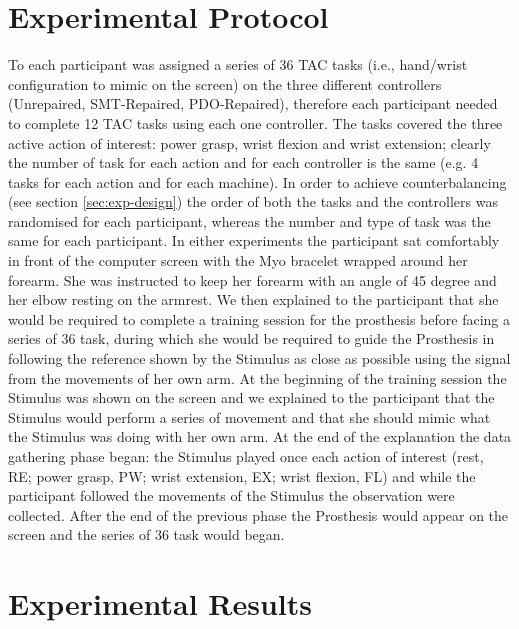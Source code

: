 \section{Experimental Protocol}\label{sec:exp-protocol}
To each participant was assigned a series of 36 TAC tasks (i.e., hand/wrist configuration to mimic on the screen) on the three different controllers (Unrepaired, SMT-Repaired, PDO-Repaired), therefore each participant needed to complete 12 TAC tasks using each one controller. The tasks covered the three active action of interest: power grasp, wrist flexion and wrist extension; clearly the number of task for each action and for each controller is the same (e.g. 4 tasks for each action and for each machine).
In order to achieve counterbalancing (see section \ref{sec:exp-design}) the order of both the tasks and the controllers was randomised for each participant, whereas the number and type of task was the same for each participant.
In either experiments the participant sat comfortably in front of the computer screen with the Myo bracelet wrapped around her forearm. She was instructed to keep her forearm with an angle of 45 degree and her elbow resting on the armrest.
We then explained to the participant that she would be required to complete a training session for the prosthesis before facing a series of 36 task, during which she would be required to guide the Prosthesis in following the reference shown by the Stimulus as close as possible using the signal from the movements of her own arm.
At the beginning of the training session the Stimulus was shown on the screen and we explained to the participant that the Stimulus would perform a series of movement and that she should mimic what the Stimulus was doing with her own arm. At the end of the explanation the data gathering phase began: the Stimulus played once each action of interest (rest, RE; power grasp, PW; wrist extension, EX; wrist flexion, FL) and while the participant followed the movements of the Stimulus the observation were collected. After the end of the previous phase the Prosthesis would appear on the screen and the series of 36 task would began.
\section{Experimental Results}\label{sec:exp-results}
